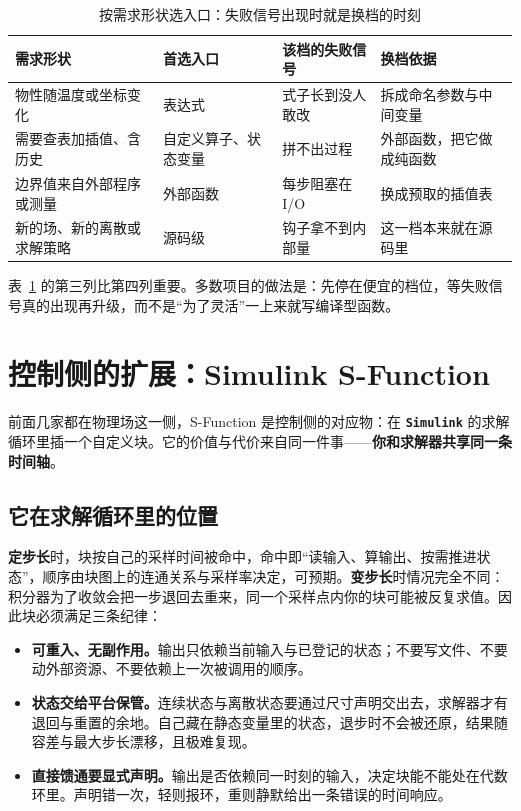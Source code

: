\documentclass[12pt,a4paper,fontset=fandol]{ctexbook}
\newcommand{\Lib}[1]{\textbf{\texttt{#1}}}
\begin{document}
\begin{table}[htbp]
\centering
{\small
\begin{tabular}{%
 >{\raggedright\arraybackslash}p{}
 >{\raggedright\arraybackslash}p{}
 >{\raggedright\arraybackslash}p{}
 >{\raggedright\arraybackslash}p{}}
\toprule
需求形状 & 首选入口 & 该档的失败信号 & 换档依据 \\
\midrule
物性随温度或坐标变化 & 表达式 & 式子长到没人敢改 & 拆成命名参数与中间变量 \\
需要查表加插值、含历史 & 自定义算子、状态变量 & 拼不出过程 & 外部函数，把它做成纯函数 \\
边界值来自外部程序或测量 & 外部函数 & 每步阻塞在 I/O & 换成预取的插值表 \\
新的场、新的离散或求解策略 & 源码级 & 钩子拿不到内部量 & 这一档本来就在源码里 \\
\bottomrule
\end{tabular}
}
\caption{按需求形状选入口：失败信号出现时就是换档的时刻}
\label{tab:ch07-pick-entry}
\end{table}

表~\ref{tab:ch07-pick-entry} 的第三列比第四列重要。多数项目的做法是：先停在便宜的档位，等失败信号真的出现再升级，而不是``为了灵活''一上来就写编译型函数。

\section{控制侧的扩展：Simulink S-Function}
\label{sec:ch07-sfunction}

前面几家都在物理场这一侧，S-Function 是控制侧的对应物：在 \Lib{Simulink} 的求解循环里插一个自定义块。它的价值与代价来自同一件事——\textbf{你和求解器共享同一条时间轴}。

\subsection*{它在求解循环里的位置}

\textbf{定步长}时，块按自己的采样时间被命中，命中即``读输入、算输出、按需推进状态''，顺序由块图上的连通关系与采样率决定，可预期。\textbf{变步长}时情况完全不同：积分器为了收敛会把一步退回去重来，同一个采样点内你的块可能被反复求值。因此块必须满足三条纪律：

\begin{itemize}
\item \textbf{可重入、无副作用。}输出只依赖当前输入与已登记的状态；不要写文件、不要动外部资源、不要依赖上一次被调用的顺序。
\item \textbf{状态交给平台保管。}连续状态与离散状态要通过尺寸声明交出去，求解器才有退回与重置的余地。自己藏在静态变量里的状态，退步时不会被还原，结果随容差与最大步长漂移，且极难复现。
\item \textbf{直接馈通要显式声明。}输出是否依赖同一时刻的输入，决定块能不能处在代数环里。声明错一次，轻则报环，重则静默给出一条错误的时间响应。
\end{itemize}
\end{document}
